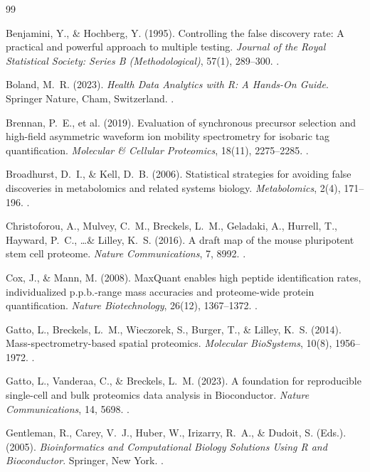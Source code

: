 \documentclass[11pt,oneside]{book}
\begin{document}
\begin{thebibliography}{99}

Benjamini, Y., \& Hochberg, Y. (1995). Controlling the false discovery rate: A practical and powerful approach to multiple testing. \textit{Journal of the Royal Statistical Society: Series B (Methodological)}, 57(1), 289--300. .

Boland, M.~R. (2023). \textit{Health Data Analytics with R: A Hands-On Guide}. Springer Nature, Cham, Switzerland. .

Brennan, P.~E., et al. (2019). Evaluation of synchronous precursor selection and high-field asymmetric waveform ion mobility spectrometry for isobaric tag quantification. \textit{Molecular \& Cellular Proteomics}, 18(11), 2275--2285. .

Broadhurst, D.~I., \& Kell, D.~B. (2006). Statistical strategies for avoiding false discoveries in metabolomics and related systems biology. \textit{Metabolomics}, 2(4), 171--196. .

Christoforou, A., Mulvey, C.~M., Breckels, L.~M., Geladaki, A., Hurrell, T., Hayward, P.~C., \dots \& Lilley, K.~S. (2016). A draft map of the mouse pluripotent stem cell proteome. \textit{Nature Communications}, 7, 8992. .

Cox, J., \& Mann, M. (2008). MaxQuant enables high peptide identification rates, individualized p.p.b.-range mass accuracies and proteome-wide protein quantification. \textit{Nature Biotechnology}, 26(12), 1367--1372. .

Gatto, L., Breckels, L.~M., Wieczorek, S., Burger, T., \& Lilley, K.~S. (2014). Mass-spectrometry-based spatial proteomics. \textit{Molecular BioSystems}, 10(8), 1956--1972. .

Gatto, L., Vanderaa, C., \& Breckels, L.~M. (2023). A foundation for reproducible single-cell and bulk proteomics data analysis in Bioconductor. \textit{Nature Communications}, 14, 5698. .

Gentleman, R., Carey, V.~J., Huber, W., Irizarry, R.~A., \& Dudoit, S. (Eds.). (2005). \textit{Bioinformatics and Computational Biology Solutions Using R and Bioconductor}. Springer, New York. .


\end{thebibliography}
\end{document}
